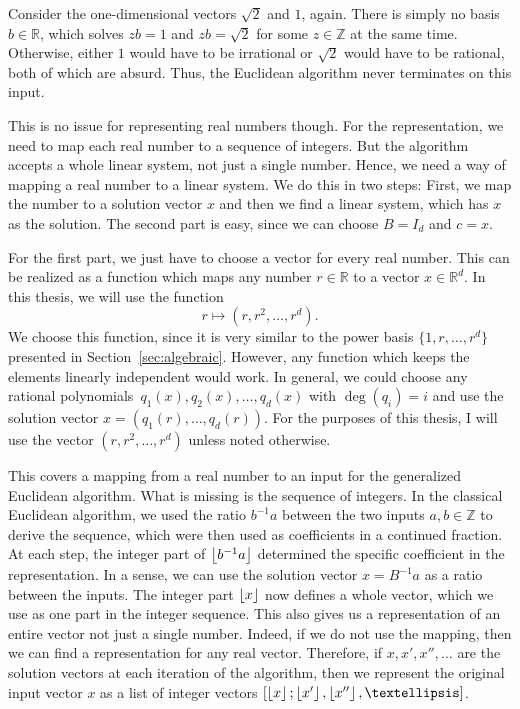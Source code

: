 \begin{example}
  Consider the one-dimensional vectors $\sqrt{2}$ and $1$, again.
  There is simply no basis $b ∈ ℝ$,
  which solves $zb = 1$ and $zb = \sqrt{2}$ for some $z ∈ ℤ$ at the same time.
  Otherwise, either $1$ would have to be irrational or $\sqrt{2}$ would have to be rational,
  both of which are absurd.
  Thus, the Euclidean algorithm never terminates on this input.
\end{example}

This is no issue for representing real numbers though.
For the representation,
we need to map each real number to a sequence of integers.
But the algorithm accepts a whole linear system,
not just a single number.
Hence, we need a way of mapping a real number to a linear system.
We do this in two steps:
First, we map the number to a solution vector $x$
and then we find a linear system,
which has $x$ as the solution.
The second part is easy,
since we can choose $B = I_d$ and $c = x$.

For the first part, we just have to choose a vector for every real number.
This can be realized as a function which maps any number $r ∈ ℝ$ to a vector $x ∈ ℝ^d$.
In this thesis, we will use the function
\[
  r ↦ (r, r^2, …, r^d).
\]
We choose this function,
since it is very similar to the power basis $\{1, r, …, r^d\}$
presented in Section~\ref{sec:algebraic}.
However, any function which keeps the elements linearly independent would work.
In general, we could choose any rational polynomials~$q_1(x), q_2(x), …, q_d(x)$
with $\deg(q_i) = i$ and use the solution vector $x = (q_1(r), …, q_d(r))$.
For the purposes of this thesis,
I will use the vector $(r, r^2, …, r^d)$ unless noted otherwise.


This covers a mapping from a real number to an input for the generalized Euclidean algorithm.
What is missing is the sequence of integers.
In the classical Euclidean algorithm,
we used the ratio $b^{-1}a$ between the two inputs $a, b ∈ ℤ$ to derive the sequence,
which were then used as coefficients in a continued fraction.
At each step, the integer part of $\left\lfloor b^{-1} a\right\rfloor$ determined the specific
coefficient in the representation.
In a sense, we can use the solution vector $x = B^{-1} a$ as a ratio between the inputs.
The integer part $\left\lfloor x\right\rfloor$ now defines a whole vector, which we use as
one part in the integer sequence.
This also gives us a representation of an entire vector not just a single number.
Indeed, if we do not use the mapping, then we can find a representation for any real vector.
Therefore, if $x, x', x'', …$ are the solution vectors at each iteration of the algorithm,
then we represent the original input vector $x$ as a list of integer vectors
$\left[\floor{x}; \floor{x'}, \floor{x''}, …\right]$.

